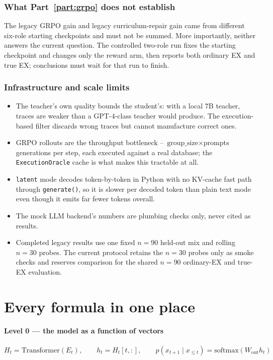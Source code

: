 \documentclass[11pt]{article}
\theoremstyle{definition}
\begin{document}
\section{What Part~\ref{part:grpo} does not establish}

The legacy GRPO gain and legacy curriculum-repair gain came from different six-role starting checkpoints and must not be summed. More importantly, neither answers the current question. The controlled two-role run fixes the starting checkpoint and changes only the reward arm, then reports both ordinary EX and true EX; conclusions must wait for that run to finish.

\section{Infrastructure and scale limits}

\begin{itemize}
\item The teacher's own quality bounds the student's: with a local $7$B teacher, traces are weaker than a GPT-4-class teacher would produce. The execution-based filter discards wrong traces but cannot manufacture correct ones.
\item GRPO rollouts are the throughput bottleneck -- $\text{group\_size}\times\text{prompts}$ generations per step, each executed against a real database; the \texttt{ExecutionOracle} cache is what makes this tractable at all.
\item \texttt{latent} mode decodes token-by-token in Python with no KV-cache fast path through \texttt{generate()}, so it is slower per decoded token than plain text mode even though it emits far fewer tokens overall.
\item The mock LLM backend's numbers are plumbing checks only, never cited as results.
\item Completed legacy results use one fixed $n=90$ held-out mix and rolling $n=30$ probes. The current protocol retains the $n=30$ probes only as smoke checks and reserves comparison for the shared $n=90$ ordinary-EX and true-EX evaluation.
\end{itemize}

\newpage
\part{Every formula in one place}
\label{part:formulas}

\subsection*{Level 0 --- the model as a function of vectors}
\[
H_t = \mathrm{Transformer}(E_t),\qquad
h_t = H_t[t,:],\qquad
p(x_{t+1}\mid x_{\le t}) = \mathrm{softmax}(W_{\mathrm{out}}h_t)
\]
\end{document}
